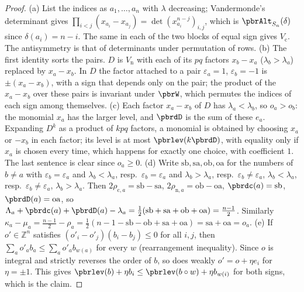 \documentclass[10pt]{amsart}
\theoremstyle{definition}
\theoremstyle{remark}
\newcommand{\Z}{\mathbb Z}
\begin{document}
\begin{proof}
(a) List the indices as $a_1,\dots,a_n$ with $\lambda$ decreasing; Vandermonde's determinant gives
$\prod_{i<j}(x_{a_i}-x_{a_j})=\det(x_{a_i}^{n-j})_{i,j}$, which is $\pbrAlt_{S_n}(\delta)$ since
$\delta(a_i)=n-i$. The same in each of the two blocks of equal sign gives $V_{\mathrm c}$. The
antisymmetry is that of determinants under permutation of rows.
(b) The first identity sorts the pairs. $D$ is $V_{\mathrm n}$ with each of its $pq$ factors
$x_b-x_a$ ($\lambda_b>\lambda_a$) replaced by $x_a-x_b$. In $D$ the factor attached to a pair
$\varepsilon_a=1$, $\varepsilon_b=-1$ is $\pm(x_a-x_b)$, with a sign that depends only on the pair; the
product of the $x_a-x_b$ over these pairs is invariant under $\pbrW$, which permutes the indices of
each sign among themselves.
(c) Each factor $x_a-x_b$ of $D$ has $\lambda_a<\lambda_b$, so $o_a>o_b$: the monomial $x_a$ has the
larger level, and $\pbrdD$ is the sum of these $e_a$. Expanding $D^k$ as a product of $kpq$ factors,
a monomial is obtained by choosing $x_a$ or $-x_b$ in each factor; its level is at most
$\pbrlev(k\pbrdD)$, with equality only if $x_a$ is chosen every time, which happens for exactly one
choice, with coefficient $1$. The last sentence is clear since $o_a\ge0$.
(d) Write $\mathrm{sb},\mathrm{sa},\mathrm{ob},\mathrm{oa}$ for the numbers of $b\ne a$ with
$\varepsilon_b=\varepsilon_a$ and $\lambda_b<\lambda_a$, resp.\ $\varepsilon_b=\varepsilon_a$ and
$\lambda_b>\lambda_a$, resp.\ $\varepsilon_b\ne\varepsilon_a$, $\lambda_b<\lambda_a$, resp.\
$\varepsilon_b\ne\varepsilon_a$, $\lambda_b>\lambda_a$. Then $2\rho_{\mathrm c,a}=\mathrm{sb}-
\mathrm{sa}$, $2\rho_{\mathrm n,a}=\mathrm{ob}-\mathrm{oa}$, $\pbrdc(a)=\mathrm{sb}$, $\pbrdD(a)=
\mathrm{oa}$, so $\Lambda_a+\pbrdc(a)+\pbrdD(a)-\lambda_a=\frac12(\mathrm{sb}+\mathrm{sa}+\mathrm{ob}
+\mathrm{oa})=\frac{n-1}2$. Similarly $\kappa_a-\mu_a=\frac{n-1}2-\rho_a=\frac12(n-1-\mathrm{sb}-
\mathrm{ob}+\mathrm{sa}+\mathrm{oa})=\mathrm{sa}+\mathrm{oa}=o_a$.
(e) If $o'\in\Z^n$ satisfies $(o'_i-o'_j)(b_i-b_j)\le0$ for all $i,j$, then $\sum_ao'_ab_a\le\sum_a
o'_ab_{w(a)}$ for every $w$ (rearrangement inequality). Since $o$ is integral and strictly reverses
the order of $b$, so does weakly $o'=o+\eta e_i$ for $\eta=\pm1$. This gives $\pbrlev(b)+\eta b_i\le
\pbrlev(b\circ w)+\eta b_{w(i)}$ for both signs, which is the claim.
\end{proof}
\end{document}
